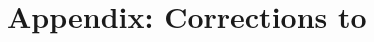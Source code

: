\documentclass[a4paper,10pt,twoside]{amsart}
\newtheorem{corollary}[theorem]{Corollary}
\theoremstyle{definition}
\numberwithin{equation}{section}
\newcommand\E{\mathbb{E}}
\renewcommand\:{\colon}
\begin{document}

\section*{Appendix: Corrections to \cite{Jaasaari--Vesalainen1}}\label{gl3sums-corrections}
\end{document}
